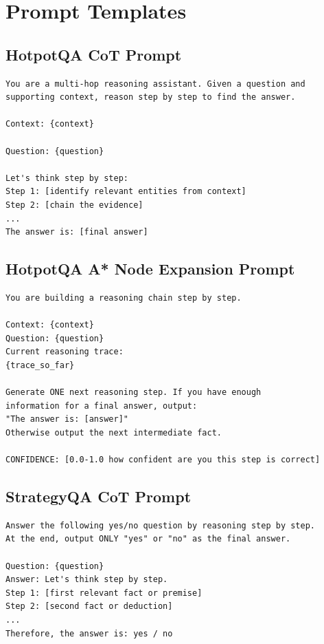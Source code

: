 \documentclass{article}
\begin{document}



\appendix

\section{Prompt Templates}
\label{app:prompts}

\subsection{HotpotQA CoT Prompt}
\begin{verbatim}
You are a multi-hop reasoning assistant. Given a question and
supporting context, reason step by step to find the answer.

Context: {context}

Question: {question}

Let's think step by step:
Step 1: [identify relevant entities from context]
Step 2: [chain the evidence]
...
The answer is: [final answer]
\end{verbatim}

\subsection{HotpotQA A* Node Expansion Prompt}
\begin{verbatim}
You are building a reasoning chain step by step.

Context: {context}
Question: {question}
Current reasoning trace:
{trace_so_far}

Generate ONE next reasoning step. If you have enough
information for a final answer, output:
"The answer is: [answer]"
Otherwise output the next intermediate fact.

CONFIDENCE: [0.0-1.0 how confident are you this step is correct]
\end{verbatim}

\subsection{StrategyQA CoT Prompt}
\begin{verbatim}
Answer the following yes/no question by reasoning step by step.
At the end, output ONLY "yes" or "no" as the final answer.

Question: {question}
Answer: Let's think step by step.
Step 1: [first relevant fact or premise]
Step 2: [second fact or deduction]
...
Therefore, the answer is: yes / no
\end{verbatim}
\end{document}

